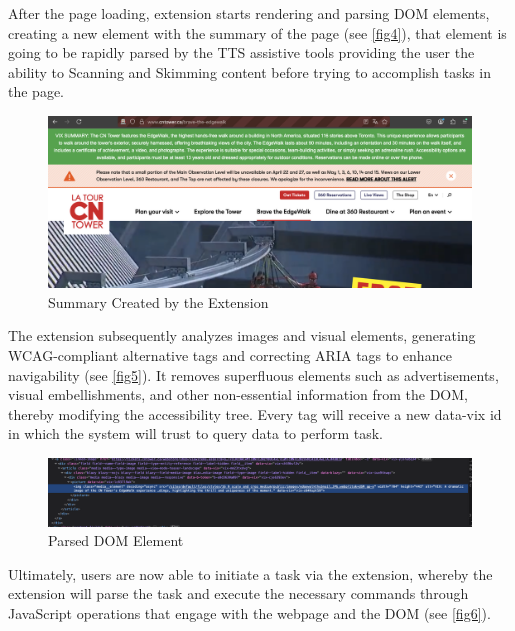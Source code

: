 \documentclass[conference]{IEEEtran}
\begin{document}
After the page loading, extension starts rendering and parsing DOM elements, creating a new element with the summary of the page (see \autoref{fig4}), that element is going to be rapidly parsed by the TTS assistive tools providing the user the ability to Scanning and Skimming content before trying to accomplish tasks in the page.

\begin{figure}[h]
\centerline{\includegraphics[width=\linewidth]{images/3.png}}
\caption{Summary Created by the Extension}
\label{fig4}
\end{figure}

The extension subsequently analyzes images and visual elements, generating WCAG-compliant alternative tags and correcting ARIA tags to enhance navigability (see \autoref{fig5}). It removes superfluous elements such as advertisements, visual embellishments, and other non-essential information from the DOM, thereby modifying the accessibility tree. Every tag will receive a new data-vix id in which the system will trust to query data to perform task.

\begin{figure}[h]
\centerline{\includegraphics[width=\linewidth]{images/4.png}}
\caption{Parsed DOM Element}
\label{fig5}
\end{figure}

Ultimately, users are now able to initiate a task via the extension, whereby the extension will parse the task and execute the necessary commands through JavaScript operations that engage with the webpage and the DOM (see \autoref{fig6}).
\end{document}
